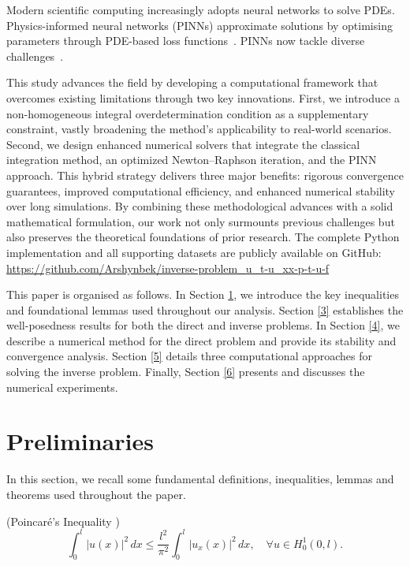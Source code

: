 \documentclass[reqno]{amsart}
\begin{document}
Modern scientific computing increasingly adopts neural networks to solve PDEs. Physics-informed neural networks (PINNs) approximate solutions by optimising parameters through PDE-based loss functions~\cite{Raissi2019}. PINNs now tackle diverse challenges~\cite{Bararnia22,Mata23}.

This study advances the field by developing a computational framework that overcomes existing limitations through two key innovations. First, we introduce a non-homogeneous integral overdetermination condition as a supplementary constraint, vastly broadening the method’s applicability to real-world scenarios. Second, we design enhanced numerical solvers that integrate the classical integration method, an optimized Newton–Raphson iteration, and the PINN approach. This hybrid strategy delivers three major benefits: rigorous convergence guarantees, improved computational efficiency, and enhanced numerical stability over long simulations. By combining these methodological advances with a solid mathematical formulation, our work not only surmounts previous challenges but also preserves the theoretical foundations of prior research. The complete Python implementation and all supporting datasets are publicly available on GitHub: \url{https://github.com/Arshynbek/inverse-problem_u_t-u_xx-p-t-u-f}

This paper is organised as follows. In Section \ref{2}, we introduce the key inequalities and foundational lemmas used throughout our analysis. Section \ref{3} establishes the well-posedness results for both the direct and inverse problems. In Section \ref{4}, we describe a numerical method for the direct problem and provide its stability and convergence analysis. Section \ref{5} details three computational approaches for solving the inverse problem. Finally, Section \ref{6} presents and discusses the numerical experiments.




\section{Preliminaries}\label{2}

In this section, we recall some fundamental definitions, inequalities, lemmas and theorems used throughout the paper.

\begin{lemma}\label{lemma2}(Poincaré’s Inequality {\cite[Prop.~8.13, p.~218]{Brezis2010}})
\[
\int_0^l |u(x)|^2\,dx \le \frac{l^2}{\pi^2} \int_0^l |u_x(x)|^2\,dx, \quad \forall u \in H^1_0(0,l).
\]
\end{lemma}
\end{document}
